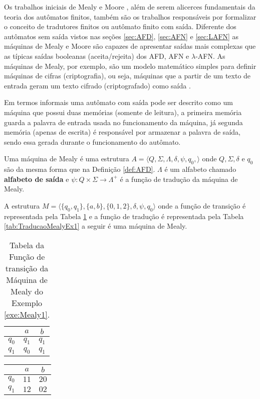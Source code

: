 Os trabalhos iniciais de Mealy \cite{mealy1955} e Moore \cite{moore1956}, além de serem alicerces fundamentais da teoria dos autômatos finitos, também são os trabalhos responsáveis por formalizar o conceito de tradutores finitos ou autômato finito com saída. Diferente dos autômatos sem saída vistos nas seções \ref{sec:AFD}, \ref{sec:AFN} e \ref{sec:LAFN} as máquinas de Mealy e Moore são capazes de apresentar saídas mais complexas que as típicas saídas booleanas (aceita/rejeita) dos AFD, AFN e $\lambda$-AFN. As máquinas de Mealy, por exemplo,  são um modelo matemático simples para definir máquinas de cifras (criptografia), ou seja, máquinas que a partir de um texto de entrada geram um texto cifrado (criptografado) como saída \cite{menezes1998LFA}.

Em termos informais uma autômato com saída pode ser descrito como um máquina que possui duas memórias (somente de leitura), a primeira memória guarda a palavra de entrada usada no funcionamento da máquina, já segunda memória (apenas de escrita) é responsável por armazenar a palavra de saída, sendo essa gerada durante o funcionamento do autômato.

\begin{definition}\label{def:MealyMachine}
	Uma máquina de Mealy é uma estrutura $A = \langle Q, \Sigma, \Lambda, \delta, \psi, q_0, \rangle$ onde $Q, \Sigma, \delta$ e $q_0$ são da mesma forma que na Definição \ref{def:AFD}. $\Lambda$ é um alfabeto chamado \textbf{alfabeto de saída} e $\psi: Q \times \Sigma \rightarrow \Lambda^+$ é a função de tradução da máquina de Mealy.
\end{definition}

\begin{example}\label{exe:Mealy1}
	A estrutura $M = \langle \{q_0, q_1\}, \{a, b\}, \{0, 1, 2\}, \delta, \psi, q_0 \rangle$ onde a função de transição é representada pela Tabela \ref{tab:TransicaoMealyEx1} e a função de tradução é representada pela Tabela \ref{tab:TraducaoMealyEx1} a seguir é uma máquina de Mealy.
	
	\begin{table}[h]
		\centering
		\begin{tabular}{c|cc}
			\backslashbox{$Q$}{$\Sigma$} & $a$ & $b$\\ \hline
			$q_0$ & $q_1$ & $q_1$ \\
			$q_1$ & $q_0$ & $q_1$
		\end{tabular}
		\caption{Tabela da Função de transição da Máquina de Mealy do Exemplo \ref{exe:Mealy1}.}
		\label{tab:TransicaoMealyEx1}
	\end{table}
	
	\begin{table*}[h]
		\centering
		\begin{tabular}{c|cc}
			\backslashbox{$Q$}{$\Sigma$} & $a$ & $b$\\ \hline
			$q_0$ & $11$ & $20$ \\
			$q_1$ & $12$ & $02$ 
		\end{tabular}
		\caption{Tabela da Função de tradução da Máquina de Mealy do Exemplo \ref{exe:Mealy1}.}
		\label{tab:TraducaoMealyEx1}
	\end{table*}
\end{example}


